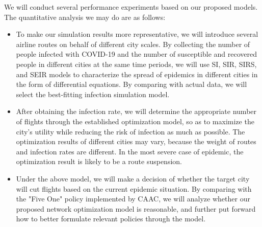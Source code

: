 \documentclass[11pt,twocolumn]{article}
\begin{document}
We will conduct several performance experiments based on our proposed models. The quantitative analysis we may do are as follows:
\begin{itemize}
    \item To make our simulation results more representative, we will introduce several airline routes on behalf of different city scales. By collecting the number of people infected with COVID-19 and the number of susceptible and recovered people in different cities at the same time periods, we will use SI, SIR, SIRS, and SEIR models to characterize the spread of epidemics in different cities in the form of differential equations. By comparing with actual data, we will select the best-fitting infection simulation model.
    \item After obtaining the infection rate, we will determine the appropriate number of flights through the established optimization model, so as to maximize the city's utility while reducing the risk of infection as much as possible. The optimization results of different cities may vary, because the weight of routes and infection rates are different. In the most severe case of epidemic, the optimization result is likely to be a route suspension.
    \item Under the above model, we will make a decision of whether the target city will cut flights based on the current epidemic situation. By comparing with the "Five One" policy implemented by CAAC, we will analyze whether our proposed network optimization model is reasonable, and further put forward how to better formulate relevant policies through the model.
\end{itemize}
\end{document}
